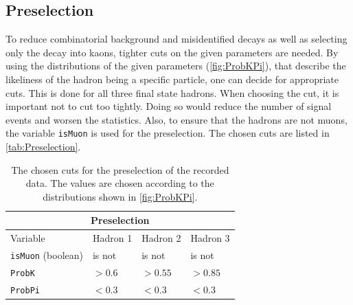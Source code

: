 \subsection{Preselection}

To reduce combinatorial background and misidentified decays as well as selecting only the decay into kaons, tighter cuts on the given parameters are needed. By using the distributions of the given
parameters (\autoref{fig:ProbKPi}), that describe the likeliness of the hadron being a specific particle, one can decide for appropriate cuts. This is done for all three final state
hadrons. When choosing the cut, it is important not to cut too tightly. Doing so would reduce the number of signal events and worsen the statistics. Also, to ensure that the
hadrons are not muons, the variable \texttt{isMuon} is used for the preselection. The chosen cuts are listed
in \autoref{tab:Preselection}.
\begin{table}[h!]
  \centering
    \begin{tabular}{ |p{3cm}||p{3cm}|p{3cm}|p{3cm}|  }
      \hline
      \multicolumn{4}{|c|}{Preselection} \\
      \hline
      Variable & Hadron 1 &Hadron 2 &Hadron 3\\
      \hline
      \texttt{isMuon} (boolean)   & is not &is not&  is not\\
      \texttt{ProbK}&   $> 0.6$  &$> 0.55$   &$> 0.85$\\
      \texttt{ProbPi} & $< 0.3$ & $< 0.3$&  $< 0.3$\\
      \hline   
    \end{tabular}
    \caption{The chosen cuts for the preselection of the recorded data. The values are chosen according to the distributions shown in \autoref{fig:ProbKPi}.}
    \label{tab:Preselection}
\end{table}


